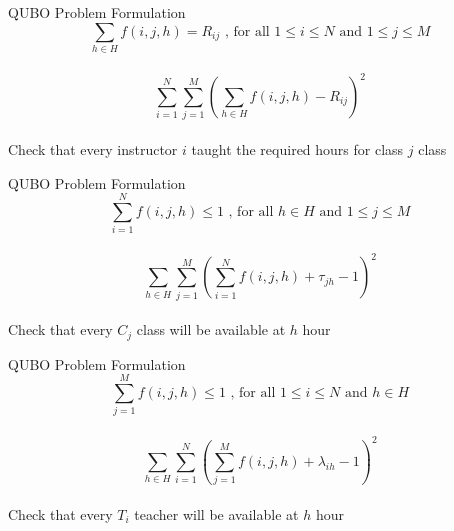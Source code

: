 \documentclass[14pt, aspectratio=169]{beamer}
\begin{document}
\begin{frame}{QUBO Problem Formulation}
    \centering
    \begin{equation}
        \sum\limits_{h \in H} f(i,j,h) = R_{ij} \text{ , for all $1 \leq i \leq N$ and $1 \leq j \leq M$}
    \end{equation}
    \bigg\downarrow\\
    \begin{equation}
        \sum_{i=1}^{N} \sum_{j=1}^{M} \left(\sum_{h\in H} f(i,j,h) - R_{ij}\right)^2
        \label{qubo1}
    \end{equation}\\
    \vspace{0.2cm}
    Check that every instructor $i$ taught the required hours for class $j$ class
    \vspace{0.5cm}
\end{frame}

\begin{frame}{QUBO Problem Formulation}
    \centering
    \begin{equation}
        \sum\limits_{i=1}^{N} f(i,j,h) \leq 1 \text{ , for all $h \in H$ and $1 \leq j \leq M$}
    \end{equation}
    \bigg\downarrow\\
    \begin{equation}
        \sum\limits_{h \in H} \sum\limits_{j=1}^{M} \left(\sum\limits_{i=1}^{N} f(i,j,h)+\tau_{jh}-1\right)^2
    \end{equation}\\
    \vspace{0.2cm}
    Check that every $C_j$ class will be available at $h$ hour
    \vspace{0.5cm}
\end{frame}

\begin{frame}{QUBO Problem Formulation}
    \centering
    \begin{equation}
        \sum\limits_{j=1}^{M} f(i,j,h) \leq 1 \text{ , for all $1 \leq i \leq N$ and $h \in H$}
    \end{equation}
    \bigg\downarrow\\
    \begin{equation}
        \sum\limits_{h \in H} \sum\limits_{i=1}^{N} \left(\sum\limits_{j=1}^{M} f(i,j,h)+\lambda_{ih}-1\right)^2
    \end{equation}\\
    \vspace{0.2cm}
    Check that every $T_i$ teacher will be available at $h$ hour
    \vspace{0.5cm}
\end{frame}
\end{document}

